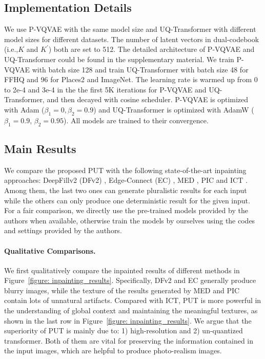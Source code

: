 \documentclass[10pt,twocolumn,letterpaper]{article}
\newcommand{\Fref}[1]{Figure~\ref{#1}}
\begin{document}
\subsection{Implementation Details}
\label{sec: implementation_details}
We use P-VQVAE with the same model size and UQ-Transformer with different model sizes for different datasets. The number of latent vectors in dual-codebook (i.e.,$K$ and $K^{'}$) both are set to 512. The detailed architecture of P-VQVAE and UQ-Transformer could be found in the supplementary material.
We train P-VQVAE with batch size 128 and train UQ-Transformer with batch size 48 for FFHQ and 96 for Places2 and ImageNet.
The learning rate is warmed up from 0 to 2e-4 and 3e-4 in the the first 5K iterations for P-VQVAE and UQ-Transformer, and then decayed with cosine scheduler.
P-VQVAE is optimized with Adam \cite{kingma2014adam} ($\beta_1=0,\beta_2=0.9$) and UQ-Transformer is optimized with AdamW \cite{loshchilov2017decoupled} ($\beta_1=0.9$, $\beta_2=0.95$). All models are trained to their convergence.











\subsection{Main Results}
\label{sec: comparison_with_other_methods}

We compare the proposed PUT with the following state-of-the-art inpainting approaches: DeepFillv2 (DFv2) \cite{yu2019free}, Edge-Connect (EC) \cite{nazeri2019edgeconnect}, MED \cite{liu2020rethinking}, PIC \cite{zheng2019pluralistic} and ICT \cite{wan2021high}. Among them, the last two ones can generate pluralistic results for each input while the others can only produce one deterministic result for the given input. For a fair comparison, we directly use the pre-trained models provided by the authors when available, otherwise train the models by ourselves using the codes and settings provided by the authors.

\paragraph{Qualitative Comparisons.} We first qualitatively compare the inpainted results of different methods in \Fref{figure: inpainting_results}. 
Specifically,  DFv2 and EC generally produce blurry images, while the texture of the results generated by MED and PIC contain lots of unnatural artifacts. Compared with ICT, PUT is more powerful in the understanding of global context and maintaining the meaningful textures, as shown in the last row in \Fref{figure: inpainting_results}.
We argue that the superiority of PUT is mainly due to: 1) high-resolution and 2) un-quantized transformer. Both of them are vital for preserving the information contained in the input images, which are helpful to produce photo-realism images.
\end{document}
